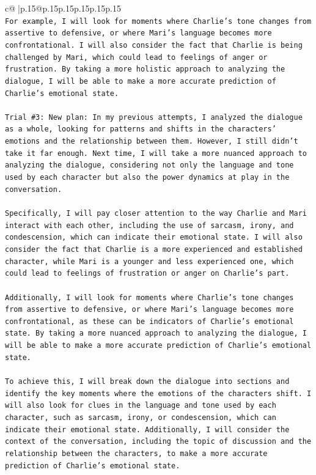 \documentclass{article}
\begin{document}
{\begin{supertabular}{c@{$\;$}|p{.15\linewidth}@{}p{.15\linewidth}p{.15\linewidth}p{.15\linewidth}p{.15\linewidth}p{.15\linewidth}}
{{{\\ 
\texttt{For example, I will look for moments where Charlie's tone changes from assertive to defensive, or where Mari's language becomes more confrontational. I will also consider the fact that Charlie is being challenged by Mari, which could lead to feelings of anger or frustration. By taking a more holistic approach to analyzing the dialogue, I will be able to make a more accurate prediction of Charlie's emotional state.} \\
\\ 
\texttt{Trial \#3: New plan: In my previous attempts, I analyzed the dialogue as a whole, looking for patterns and shifts in the characters' emotions and the relationship between them. However, I still didn't take it far enough. Next time, I will take a more nuanced approach to analyzing the dialogue, considering not only the language and tone used by each character but also the power dynamics at play in the conversation.} \\
\\ 
\texttt{Specifically, I will pay closer attention to the way Charlie and Mari interact with each other, including the use of sarcasm, irony, and condescension, which can indicate their emotional state. I will also consider the fact that Charlie is a more experienced and established character, while Mari is a younger and less experienced one, which could lead to feelings of frustration or anger on Charlie's part.} \\
\\ 
\texttt{Additionally, I will look for moments where Charlie's tone changes from assertive to defensive, or where Mari's language becomes more confrontational, as these can be indicators of Charlie's emotional state. By taking a more nuanced approach to analyzing the dialogue, I will be able to make a more accurate prediction of Charlie's emotional state.} \\
\\ 
\texttt{To achieve this, I will break down the dialogue into sections and identify the key moments where the emotions of the characters shift. I will also look for clues in the language and tone used by each character, such as sarcasm, irony, or condescension, which can indicate their emotional state. Additionally, I will consider the context of the conversation, including the topic of discussion and the relationship between the characters, to make a more accurate prediction of Charlie's emotional state.} \\
\\ 
}}}
\end{supertabular}}
\end{document}
